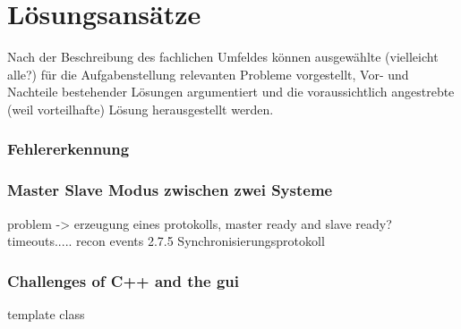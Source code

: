 \chapter{Lösungsansätze}\label{chp:loesungsansaetze}
Nach der Beschreibung des fachlichen Umfeldes können ausgewählte (vielleicht alle?) für die Aufgabenstellung relevanten Probleme vorgestellt, Vor- und Nachteile bestehender Lösungen argumentiert und die voraussichtlich angestrebte (weil vorteilhafte) Lösung herausgestellt werden.

\subsection{Fehlererkennung}

\subsection{Master Slave Modus zwischen zwei Systeme}
problem -> erzeugung eines protokolls, master ready and slave ready?
timeouts.....
recon events
2.7.5 Synchronisierungsprotokoll

\subsection{Challenges of C++ and the gui}
template class\\